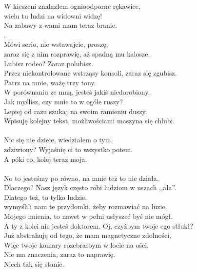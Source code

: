 \chardok{}
W kieszeni znalazłem ognioodporne rękawice,\\
wielu tu ludzi na widowni widzę!\\
Na zabawy z wami mam teraz branie.\\
.\\

\charfer{}
Mówi serio, nie wstawajcie, proszę,\\
zaraz się z nim rozprawię, aż spadną mu kalosze.\\
Lubisz rodeo? Zaraz polubisz.\\
Przez niekontrolowane wstrząsy konsoli, zaraz się zgubisz.\\
Patrz na mnie, ważę trzy tony.\\
W porównaniu ze mną, jesteś jakiś niedorobiony.\\
Jak myślisz, czy mnie to w ogóle ruszy?\\
Lepiej od razu szukaj na swoim ramieniu duszy.\\
Wpisuję kolejny tekst, możliwościami maszyna się chlubi.\\
\\

\chardok{}
Nic się nie dzieje, wiedziałem o tym,\\
zdziwiony? Wyjaśnię ci to wszystko potem.\\
A póki co, kolej teraz moja.\\
\\

\charfer{}
No to jesteśmy po równo, na mnie też to nie działa.\\
Dlaczego? Nasz język często robi ludziom w uszach ,,ała''.\\
Dlatego też, to tylko ludzie,\\
wymyślili nam te przydomki, żeby rozmawiać na luzie.\\
Mojego imienia, to nawet w pełni usłyszeć byś nie mógł.\\
A ty z kolei nie jesteś doktorem. Oj, czyżbym twoje ego stłukł?\\
Już abstrahuję od tego, że mam magnetyczne zdolności, \\
Więc twoje komary rozebrałbym w locie na ości. \\

\chardok{}
Nie ma znaczenia, zaraz to naprawię.\\
 Niech tak się stanie.\\

